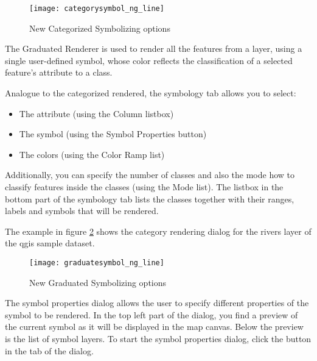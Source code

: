 \begin{figure}[ht]
   \begin{center}
   \caption{New Categorized Symbolizing options \nixcaption}\label{fig:catsymNG}\smallskip
   \texttt{[image: categorysymbol\_ng\_line]}
\end{center}
\end{figure}


The Graduated Renderer is used to render all the features from a layer, using 
a single user-defined symbol, whose color reflects the classification of a selected 
feature's attribute to a class.

Analogue to the categorized rendered, the symbology tab allows you to select:

\begin{itemize}
\item The attribute (using the Column listbox)
\item The symbol (using the Symbol Properties button)
\item The colors (using the Color Ramp list)
\end{itemize}

Additionally, you can specify the number of classes and also the mode how to 
classify features inside the classes (using the Mode list). The listbox in the 
bottom part of the symbology tab lists the classes together with their ranges, 
labels and symbols that will be rendered.

The example in figure \ref{fig:gradsymNG} shows the category rendering dialog 
for the rivers layer of the qgis sample dataset.

\begin{figure}[ht]
   \begin{center}
   \caption{New Graduated Symbolizing options \nixcaption}\label{fig:gradsymNG}\smallskip
   \texttt{[image: graduatesymbol\_ng\_line]}
\end{center}
\end{figure}


The symbol properties dialog allows the user to specify different properties of 
the symbol to be rendered. In the top left part of the dialog, you find a preview 
of the current symbol as it will be displayed in the map canvas. Below the preview 
is the list of symbol layers. To start the symbol properties dialog, click the 
 button in the  tab of the
 dialog. 

